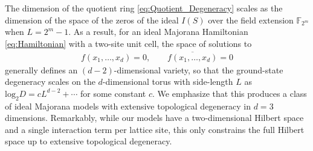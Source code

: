 \documentclass[aps,twocolumn,preprintnumbers,floatfix,showpacs,prx]{revtex4-1}
\begin{document}
The dimension of the quotient ring \eqref{eq:Quotient_Degeneracy}
scales as the dimension of the space of the zeros of the ideal $I(S)$ over the field extension $\mathbb{F}_{2^m}$
when $L = 2^m -1$.
As a result, for an ideal Majorana Hamiltonian \eqref{eq:Hamiltonian}
with a two-site unit cell, the space of solutions to 
\begin{align}
f(x_{1},\ldots,x_{d}) = 0, \quad \quad \overline{f(x_{1},\ldots,x_{d})} = 0
\end{align}
generally defines an $(d - 2)$-dimensional variety,
so that the ground-state degeneracy scales on the $d$-dimensional torus with side-length $L$
as $\mathrm{log}_{2}D = cL^{d-2} + \cdots$ for some constant $c$.
We emphasize that this produces a class of ideal Majorana models with extensive topological degeneracy in $d = 3$ dimensions.
Remarkably, while our models have a two-dimensional Hilbert space and a single interaction term per lattice site, this only constrains the full Hilbert space up to extensive topological degeneracy.
\end{document}
